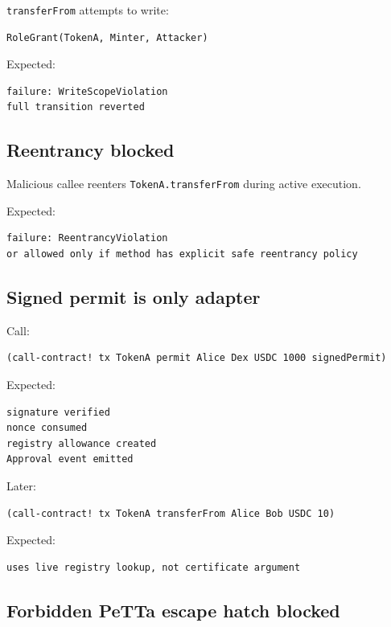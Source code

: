 \documentclass[11pt]{article}
\newcommand{\code}[1]{\texttt{#1}}
\begin{document}
\code{transferFrom} attempts to write:

\begin{lstlisting}
RoleGrant(TokenA, Minter, Attacker)
\end{lstlisting}

Expected:

\begin{lstlisting}
failure: WriteScopeViolation
full transition reverted
\end{lstlisting}

\subsection{Reentrancy blocked}

Malicious callee reenters \code{TokenA.transferFrom} during active execution.

Expected:

\begin{lstlisting}
failure: ReentrancyViolation
or allowed only if method has explicit safe reentrancy policy
\end{lstlisting}

\subsection{Signed permit is only adapter}

Call:

\begin{lstlisting}
(call-contract! tx TokenA permit Alice Dex USDC 1000 signedPermit)
\end{lstlisting}

Expected:

\begin{lstlisting}
signature verified
nonce consumed
registry allowance created
Approval event emitted
\end{lstlisting}

Later:

\begin{lstlisting}
(call-contract! tx TokenA transferFrom Alice Bob USDC 10)
\end{lstlisting}

Expected:

\begin{lstlisting}
uses live registry lookup, not certificate argument
\end{lstlisting}

\subsection{Forbidden PeTTa escape hatch blocked}
\end{document}
